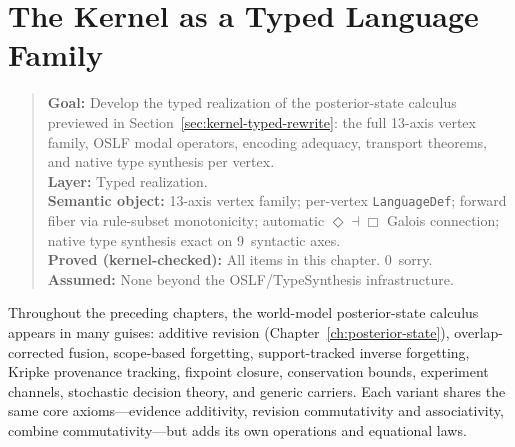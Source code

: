 \documentclass[11pt,openany]{report}
\begin{document}
\chapter{The Kernel as a Typed Language Family}
\label{ch:wm-gslt}

\begin{quote}\small
\textbf{Goal:} Develop the typed realization of the posterior-state calculus
previewed in Section~\ref{sec:kernel-typed-rewrite}: the full 13-axis vertex
family, OSLF modal operators, encoding adequacy, transport theorems, and
native type synthesis per vertex.\\
\textbf{Layer:} Typed realization.\\
\textbf{Semantic object:} 13-axis vertex family; per-vertex \texttt{LanguageDef};
forward fiber via rule-subset monotonicity; automatic $\Diamond\dashv\Box$
Galois connection; native type synthesis exact on 9~syntactic axes.\\
\textbf{Proved (kernel-checked):} All items in this chapter.  0~sorry.\\
\textbf{Assumed:} None beyond the OSLF/TypeSynthesis infrastructure.
\end{quote}

Throughout the preceding chapters, the world-model posterior-state calculus
appears in many guises: additive revision (Chapter~\ref{ch:posterior-state}),
overlap-corrected fusion, scope-based forgetting, support-tracked inverse
forgetting, Kripke provenance tracking, fixpoint closure, conservation
bounds, experiment channels, stochastic decision theory, and generic
carriers.  Each variant shares the same core axioms---evidence additivity,
revision commutativity and associativity, combine commutativity---but adds
its own operations and equational laws.
\end{document}
